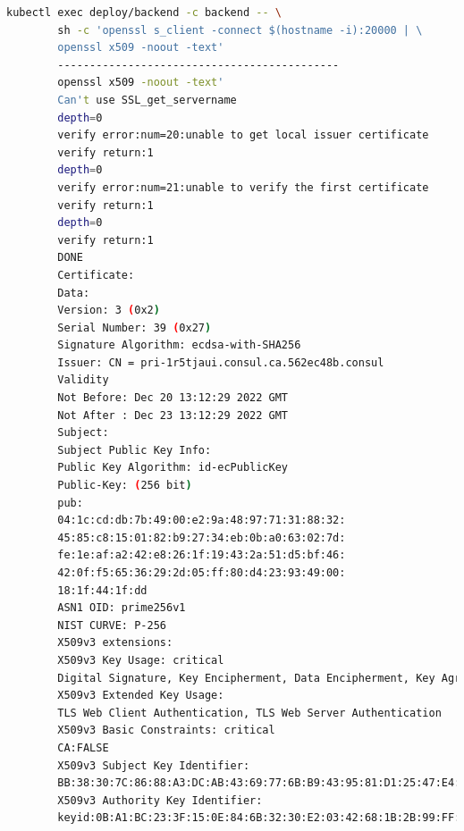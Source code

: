 \documentclass[14pt,a4paper]{report}
\begin{document}
{	\hspace{0.3cm}{Tiếp theo đấy, chúng ta sẽ kiểm tra xem thông tin chứng chỉ mà Consul tạo ra cho ứng dụng. Để kiểm tra, đầu tiên chúng ta cần truy cập được vào trong container ứng dụng với câu lệnh sau:}
	\begin{lstlisting}[language=Bash]
		kubectl exec deploy/backend -c backend -- \
		sh -c 'openssl s_client -connect $(hostname -i):20000 | \
		openssl x509 -noout -text'
		--------------------------------------------
		openssl x509 -noout -text'
		Can't use SSL_get_servername
		depth=0
		verify error:num=20:unable to get local issuer certificate
		verify return:1
		depth=0
		verify error:num=21:unable to verify the first certificate
		verify return:1
		depth=0
		verify return:1
		DONE
		Certificate:
		Data:
		Version: 3 (0x2)
		Serial Number: 39 (0x27)
		Signature Algorithm: ecdsa-with-SHA256
		Issuer: CN = pri-1r5tjaui.consul.ca.562ec48b.consul
		Validity
		Not Before: Dec 20 13:12:29 2022 GMT
		Not After : Dec 23 13:12:29 2022 GMT
		Subject:
		Subject Public Key Info:
		Public Key Algorithm: id-ecPublicKey
		Public-Key: (256 bit)
		pub:
		04:1c:cd:db:7b:49:00:e2:9a:48:97:71:31:88:32:
		45:85:c8:15:01:82:b9:27:34:eb:0b:a0:63:02:7d:
		fe:1e:af:a2:42:e8:26:1f:19:43:2a:51:d5:bf:46:
		42:0f:f5:65:36:29:2d:05:ff:80:d4:23:93:49:00:
		18:1f:44:1f:dd
		ASN1 OID: prime256v1
		NIST CURVE: P-256
		X509v3 extensions:
		X509v3 Key Usage: critical
		Digital Signature, Key Encipherment, Data Encipherment, Key Agreement
		X509v3 Extended Key Usage:
		TLS Web Client Authentication, TLS Web Server Authentication
		X509v3 Basic Constraints: critical
		CA:FALSE
		X509v3 Subject Key Identifier:
		BB:38:30:7C:86:88:A3:DC:AB:43:69:77:6B:B9:43:95:81:D1:25:47:E4:FA:9C:D6:AB:C2:A1:FE:99:51:FA:F7
		X509v3 Authority Key Identifier:
		keyid:0B:A1:BC:23:3F:15:0E:84:6B:32:30:E2:03:42:68:1B:2B:99:FF:7F:78:F1:71:0B:9D:70:5A:C0:F0:DE:66:A0
		

\end{lstlisting}}
\end{document}
